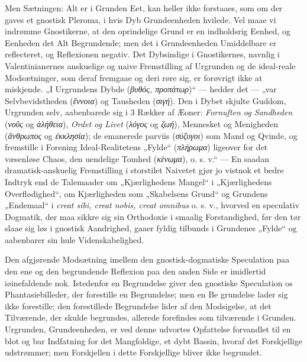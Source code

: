 \documentclass[11pt]{book}
\newcommand{\opage}[1]{\marginnote{\footnotesize\textit{[#1]}}}
\begin{document}
Men Sætningen: Alt er i Grunden Eet, kan heller ikke
forstaaes, som om der gaves et gnostisk Pleroma, i hvis Dyb
Grundeenheden hvilede. Vel maae vi indrømme Gnostikerne,
at den oprindelige Grund er en indholdsrig Eenhed, og
Eenheden det Alt Begrundende; men det i Grundeenheden
Umiddelbare er reflecteret, og Reflexionen negativ. Det
Dybsindige i Gnostikernes, navnlig i Valentinianernes
anskuelige og naive Fremstilling af Urgrunden og de
ideal-reale Modsætninger, som deraf fremgaae og deri røre sig,
er forøvrigt ikke at miskjende. „I Urgrundens Dybde
(\textit{βυθός, προπάτωρ})“ --- hedder det --- „var
Selvbevidstheden (\textit{ἔννοια}) og Tausheden
(\textit{σιγή}). Den i Dybet skjulte Guddom, Urgrunden selv,
aabenbarede sig i 3 Rækker af Æoner: \emph{Fornuften og
Sandheden} (\textit{νοῦς} og \textit{ἀλήθεια}), \emph{Ordet og
Livet} (\textit{λόγος} og \textit{ζωή}), Mennesket og
Menigheden (\textit{ἄνθρωπος} og \textit{ἐκκλησία});
de emanerede parviis (\textit{σύζυγοι}) som Mand og Qvinde,
og fremstille i Forening Ideal-Realitetens „Fylde“
(\textit{πλήρωμα}) ligeover for det væsenløse Chaos, den
uendelige Tomhed (\textit{κένωμα}), o. s. v.“ --- En saadan
dramatisk-anskuelig Fremstilling i storstilet Naivetet gjør jo
vistnok et bedre Indtryk end de Talemaader om
„Kjærlighedens Mangel“ i „Kjærlighedens Overflødighed“, om
Kjærligheden som „Skabelsens Grund“ og Grundens
„Endemaal“ i \textit{creat sibi, creat nobis, creat omnibus}
o. s. v., hvorved en speculativ Dogmatik, der maa sikkre sig
sin Orthodoxie i smaalig Forstandighed, før den tør slaae sig
løs i gnostisk Aandrighed, gaaer fyldig tilbunds i Grundenes
„Fylde“ og aabenbarer sin hule Videnskabelighed.

Den afgjørende Modsætning imellem den gnostisk-dogmatiske
Speculation paa den ene og den begrundende Reflexion paa
den anden Side er imidlertid iøinefaldende nok. Istedenfor en
Begrundelse giver den gnostiske Speculation os
Phantasiebilleder, der forestille en Begrundelse; men en Be\-%
\opage{96} \setcounter{footnote}{0}%
grundelse lader sig ikke forestille; den forestillede Begrundelse
lider af den Modsigelse, at det Tilværende, der skulde begrundes,
allerede forefindes som tilværende i Grunden. Urgrunden,
Grundeenheden, er ved denne udvortes Opfattelse forvandlet til en
blot og bar Indfatning for det Mangfoldige, et dybt Bassin, hvoraf
det Forskjellige udstrømmer; men Forskjellen i dette Forskjellige
bliver ikke begrundet.
\end{document}
